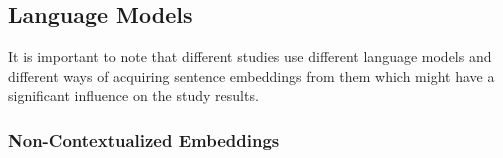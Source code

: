 


\subsection{Language Models}
\label{sec:review:LM:models}
It is important to note that different studies use different language models and different ways of acquiring sentence embeddings from them which might have a significant influence on the study results. 

\subsubsection{Non-Contextualized Embeddings}


